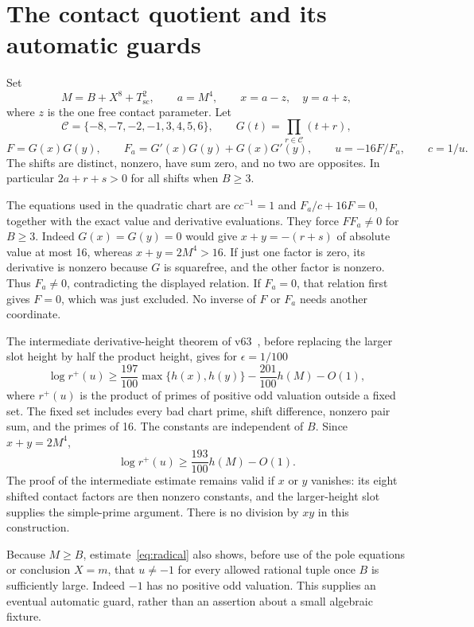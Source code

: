 \documentclass[11pt,a4paper]{article}
\begin{document}
\section{The contact quotient and its automatic guards}

Set
\[
 M=B+X^8+T_{\mathrm{sc}}^2,\qquad a=M^4,\qquad
 x=a-z,\quad y=a+z,
\]
where $z$ is the one free contact parameter. Let
\[
 \mathcal C=\{-8,-7,-2,-1,3,4,5,6\},\qquad
 G(t)=\prod_{r\in\mathcal C}(t+r),
\]
\begin{equation}\label{eq:derivative}
 F=G(x)G(y),\qquad F_a=G'(x)G(y)+G(x)G'(y),\qquad
 u=-16F/F_a,\qquad c=1/u.
\end{equation}
The shifts are distinct, nonzero, have sum zero, and no two are
opposites. In particular $2a+r+s>0$ for all shifts when $B\ge3$.

The equations used in the quadratic chart are $c c^{-1}=1$ and
$F_a/c+16F=0$, together with the exact value and derivative evaluations.
They force $F F_a\ne0$ for $B\ge3$. Indeed $G(x)=G(y)=0$ would give
$x+y=-(r+s)$ of absolute value at most 16, whereas $x+y=2M^4>16$.
If just one factor is zero, its derivative is nonzero because $G$ is
squarefree, and the other factor is nonzero. Thus $F_a\ne0$, contradicting
the displayed relation. If $F_a=0$, that relation first gives $F=0$,
which was just excluded. No inverse of $F$ or $F_a$ needs another
coordinate.

The intermediate derivative-height theorem of v63~\cite{v63}, before
replacing the larger slot height by half the product height, gives for
$\epsilon=1/100$
\[
 \log r^+(u)\ge\frac{197}{100}\max\{h(x),h(y)\}
                         -\frac{201}{100}h(M)-O(1),
\]
where $r^+(u)$ is the product of primes of positive odd valuation
outside a fixed set. The fixed set includes every bad chart prime,
shift difference, nonzero pair sum, and the primes of 16.
The constants are independent of $B$. Since $x+y=2M^4$,
\begin{equation}\label{eq:radical}
             \log r^+(u)\ge\frac{193}{100}h(M)-O(1).
\end{equation}
The proof of the intermediate estimate remains valid if $x$ or $y$
vanishes: its eight shifted contact factors are then nonzero constants,
and the larger-height slot supplies the simple-prime argument.
There is no division by $xy$ in this construction.

Because $M\ge B$, estimate~\eqref{eq:radical} also shows, before use of
the pole equations or conclusion $X=m$, that $u\ne-1$ for every
allowed rational tuple once $B$ is sufficiently large. Indeed $-1$
has no positive odd valuation. This supplies an eventual automatic
guard, rather than an assertion about a small algebraic fixture.
\end{document}
